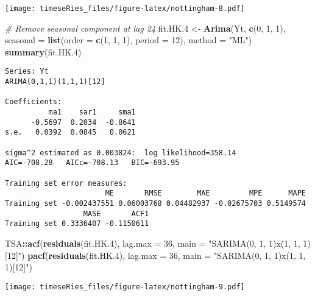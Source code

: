 \documentclass[]{book}
\newenvironment{Shaded}{\begin{snugshade}}{\end{snugshade}}
\newcommand{\KeywordTok}[1]{\textcolor[rgb]{0.13,0.29,0.53}{\textbf{#1}}}
\newcommand{\DataTypeTok}[1]{\textcolor[rgb]{0.13,0.29,0.53}{#1}}
\newcommand{\DecValTok}[1]{\textcolor[rgb]{0.00,0.00,0.81}{#1}}
\newcommand{\StringTok}[1]{\textcolor[rgb]{0.31,0.60,0.02}{#1}}
\newcommand{\CommentTok}[1]{\textcolor[rgb]{0.56,0.35,0.01}{\textit{#1}}}
\newcommand{\OperatorTok}[1]{\textcolor[rgb]{0.81,0.36,0.00}{\textbf{#1}}}
\newcommand{\NormalTok}[1]{#1}
\begin{document}
\texttt{[image: timeseRies\_files/figure-latex/nottingham-8.pdf]}

\begin{Shaded}
\begin{Highlighting}[]
\CommentTok{# Remove seasonal component at lag 24}
\NormalTok{fit.HK.}\DecValTok{4}\NormalTok{ <-}\StringTok{ }\KeywordTok{Arima}\NormalTok{(Yt, }\KeywordTok{c}\NormalTok{(}\DecValTok{0}\NormalTok{, }\DecValTok{1}\NormalTok{, }\DecValTok{1}\NormalTok{), }\DataTypeTok{seasonal =} \KeywordTok{list}\NormalTok{(}\DataTypeTok{order =} \KeywordTok{c}\NormalTok{(}\DecValTok{1}\NormalTok{, }\DecValTok{1}\NormalTok{, }\DecValTok{1}\NormalTok{), }\DataTypeTok{period =} \DecValTok{12}\NormalTok{), }
    \DataTypeTok{method =} \StringTok{"ML"}\NormalTok{)}
\KeywordTok{summary}\NormalTok{(fit.HK.}\DecValTok{4}\NormalTok{)}
\end{Highlighting}
\end{Shaded}

\begin{verbatim}
Series: Yt 
ARIMA(0,1,1)(1,1,1)[12] 

Coefficients:
          ma1    sar1     sma1
      -0.5697  0.2034  -0.8641
s.e.   0.0392  0.0845   0.0621

sigma^2 estimated as 0.003824:  log likelihood=358.14
AIC=-708.28   AICc=-708.13   BIC=-693.95

Training set error measures:
                       ME       RMSE        MAE         MPE      MAPE
Training set -0.002437551 0.06003768 0.04482937 -0.02675703 0.5149574
                  MASE       ACF1
Training set 0.3336407 -0.1150611
\end{verbatim}

\begin{Shaded}
\begin{Highlighting}[]
\NormalTok{TSA}\OperatorTok{::}\KeywordTok{acf}\NormalTok{(}\KeywordTok{residuals}\NormalTok{(fit.HK.}\DecValTok{4}\NormalTok{), }\DataTypeTok{lag.max =} \DecValTok{36}\NormalTok{, }\DataTypeTok{main =} \StringTok{"SARIMA(0, 1, 1)x(1, 1, 1)[12]"}\NormalTok{)}
\KeywordTok{pacf}\NormalTok{(}\KeywordTok{residuals}\NormalTok{(fit.HK.}\DecValTok{4}\NormalTok{), }\DataTypeTok{lag.max =} \DecValTok{36}\NormalTok{, }\DataTypeTok{main =} \StringTok{"SARIMA(0, 1, 1)x(1, 1, 1)[12]"}\NormalTok{)}
\end{Highlighting}
\end{Shaded}

\texttt{[image: timeseRies\_files/figure-latex/nottingham-9.pdf]}
\end{document}

